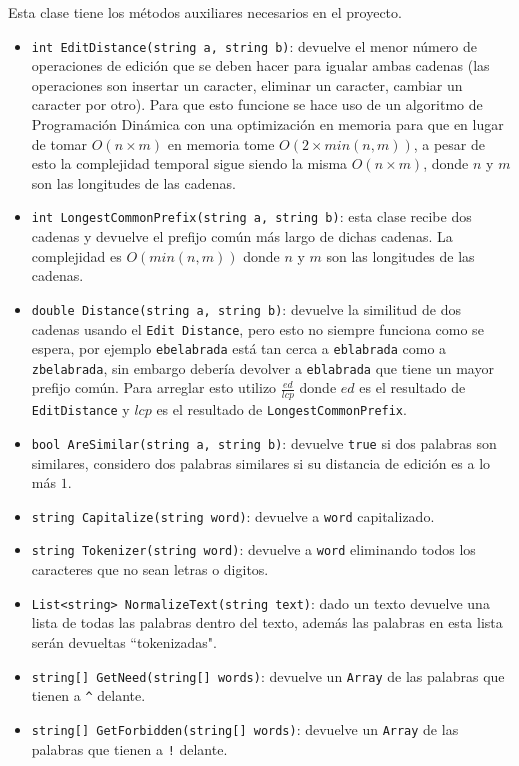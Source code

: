 \documentclass[a4paper, 12pt]{report}
\begin{document}
Esta clase tiene los m\'etodos auxiliares necesarios en el proyecto.

\begin{itemize}
	\item {\tt int EditDistance(string a, string b)}:  devuelve el menor n\'umero de operaciones de edici\'on
	      que se deben hacer para igualar ambas cadenas (las operaciones son insertar un caracter, eliminar un caracter,
	      cambiar un caracter por otro). Para que esto funcione se hace uso de un algoritmo de Programaci\'on Din\'amica con una
	      optimizaci\'on en memoria para que en lugar de tomar $O(n \times m)$ en memoria tome $O(2 \times min(n, m))$,
	      a pesar de esto la complejidad temporal sigue siendo la misma $O(n \times m)$, donde $n$ y $m$ son las longitudes de las cadenas.
	\item {\tt int LongestCommonPrefix(string a, string b)}: esta clase recibe dos cadenas y
	      devuelve el prefijo com\'un m\'as largo de dichas cadenas. La complejidad es $O(min(n, m))$ donde $n$ y $m$
	      son las longitudes de las cadenas.
	\item {\tt double Distance(string a, string b)}: devuelve la similitud de dos cadenas usando el {\tt Edit Distance}, pero
	      esto no siempre funciona como se espera, por ejemplo {\tt ebelabrada} est\'a tan cerca a {\tt eblabrada} como a {\tt zbelabrada},
	      sin embargo deber\'ia devolver a {\tt eblabrada} que tiene un mayor prefijo com\'un. Para arreglar esto utilizo
	      $\frac{ed}{lcp}$ donde $ed$ es el resultado de {\tt EditDistance} y $lcp$ es el resultado de {\tt LongestCommonPrefix}.
	\item {\tt bool AreSimilar(string a, string b)}: devuelve {\tt true} si dos palabras son similares, considero dos palabras
	      similares si su distancia de edici\'on es a lo m\'as $1$.
	\item {\tt string Capitalize(string word)}: devuelve a {\tt word} capitalizado.
	\item {\tt string Tokenizer(string word)}: devuelve a {\tt word} eliminando todos los caracteres que no sean letras o digitos.
	\item {\tt List<string> NormalizeText(string text)}: dado un texto devuelve una lista de todas las palabras dentro del texto,
	      adem\'as las palabras en esta lista ser\'an devueltas ``tokenizadas".
	\item {\tt string[] GetNeed(string[] words)}: devuelve un {\tt Array} de las palabras que tienen a {\tt \^{}} delante.
	\item {\tt string[] GetForbidden(string[] words)}: devuelve un {\tt Array} de las palabras que tienen a {\tt !} delante.

\end{itemize}
\end{document}

